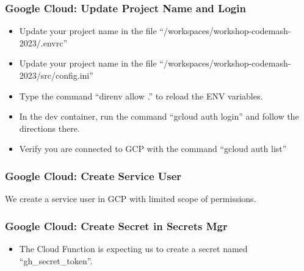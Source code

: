 \documentclass[aspectratio=169]{beamer}
\begin{document}
\begin{frame}
	\frametitle{Google Cloud: Update Project Name and Login}
	\begin{itemize}
		\item Update your project name in the file ``/workspaces/workshop-codemash-2023/.envrc''
		\item Update your project name in the file ``/workspaces/workshop-codemash-2023/src/config.ini''
		\item Type the command ``direnv allow .'' to reload the ENV variables.
		\item In the dev container, run the command ``gcloud auth login'' and follow the directions there.
		\item Verify you are connected to GCP with the command ``gcloud auth list''	
	\end{itemize}
\end{frame}

\begin{frame}
	\frametitle{Google Cloud: Create Service User}
	
	We create a service user in GCP with limited scope of permissions.
	
\end{frame}

\begin{frame}
	\frametitle{Google Cloud: Create Secret in Secrets Mgr}
	
	\begin{itemize}
		\item The Cloud Function is expecting us to create a secret named ``gh\_secret\_token''.
	\end{itemize}
	
\end{frame}

\end{document}
